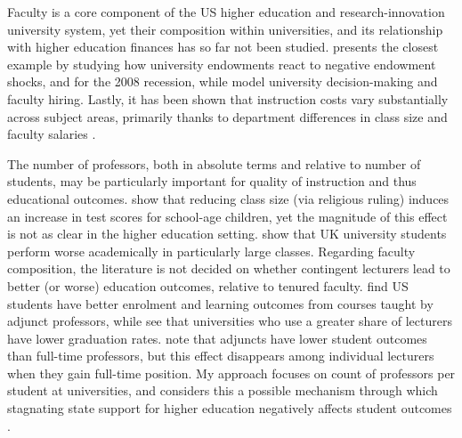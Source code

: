 Faculty is a core component of the US higher education and research-innovation university system, yet their composition within universities, and its relationship with higher education finances has so far not been studied.
\cite{brown2014endowment} presents the closest example by studying how university endowments react to negative endowment shocks, and \cite{turner2014impact} for the 2008 recession, while \cite{abe2015implications,johnson2009jep,NBERc13879} model university decision-making and faculty hiring.
Lastly, it has been shown that instruction costs vary substantially across subject areas, primarily thanks to department differences in class size and faculty salaries \citep{hemelt2021math}.

The number of professors, both in absolute terms and relative to number of students, may be particularly important for quality of instruction and thus educational outcomes.
\cite{angrist1999using} show that reducing class size (via religious ruling) induces an increase in test scores for school-age children, yet the magnitude of this effect is not as clear in the higher education setting.
\cite{bandiera2010heterogeneous} show that UK university students perform worse academically in particularly large classes.
Regarding faculty composition, the literature is not decided on whether contingent lecturers lead to better (or worse) education outcomes, relative to tenured faculty.
\cite{bettinger2010does,figlio2015tenure} find US students have better enrolment and learning outcomes from courses taught by adjunct professors, while \cite{ehrenberg2005tenured} see that universities who use a greater share of lecturers have lower graduation rates.
\cite{zhu2021limited} note that adjuncts have lower student outcomes than full-time professors, but this effect disappears among individual lecturers when they gain full-time position. 
My approach focuses on count of professors per student at universities, and considers this a possible mechanism through which stagnating state support for higher education negatively affects student outcomes \citep{NBERw23736,NBERw27885}.
